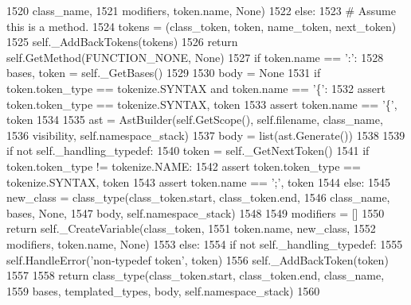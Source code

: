 \begin{DoxyCode}
1520                                                 class\_name,
1521                                                 modifiers, token.name, \textcolor{keywordtype}{None})
1522                 \textcolor{keywordflow}{else}:
1523                     \textcolor{comment}{# Assume this is a method.}
1524                     tokens = (class\_token, token, name\_token, next\_token)
1525                     self.\_AddBackTokens(tokens)
1526                     \textcolor{keywordflow}{return} self.GetMethod(FUNCTION\_NONE, \textcolor{keywordtype}{None})
1527             \textcolor{keywordflow}{if} token.name == \textcolor{stringliteral}{':'}:
1528                 bases, token = self.\_GetBases()
1529 
1530         body = \textcolor{keywordtype}{None}
1531         \textcolor{keywordflow}{if} token.token\_type == tokenize.SYNTAX \textcolor{keywordflow}{and} token.name == \textcolor{stringliteral}{'\{'}:
1532             \textcolor{keyword}{assert} token.token\_type == tokenize.SYNTAX, token
1533             \textcolor{keyword}{assert} token.name == \textcolor{stringliteral}{'\{'}, token
1534 
1535             ast = AstBuilder(self.GetScope(), self.filename, class\_name,
1536                              visibility, self.namespace\_stack)
1537             body = list(ast.Generate())
1538 
1539             \textcolor{keywordflow}{if} \textcolor{keywordflow}{not} self.\_handling\_typedef:
1540                 token = self.\_GetNextToken()
1541                 \textcolor{keywordflow}{if} token.token\_type != tokenize.NAME:
1542                     \textcolor{keyword}{assert} token.token\_type == tokenize.SYNTAX, token
1543                     \textcolor{keyword}{assert} token.name == \textcolor{stringliteral}{';'}, token
1544                 \textcolor{keywordflow}{else}:
1545                     new\_class = class\_type(class\_token.start, class\_token.end,
1546                                            class\_name, bases, \textcolor{keywordtype}{None},
1547                                            body, self.namespace\_stack)
1548 
1549                     modifiers = []
1550                     \textcolor{keywordflow}{return} self.\_CreateVariable(class\_token,
1551                                                 token.name, new\_class,
1552                                                 modifiers, token.name, \textcolor{keywordtype}{None})
1553         \textcolor{keywordflow}{else}:
1554             \textcolor{keywordflow}{if} \textcolor{keywordflow}{not} self.\_handling\_typedef:
1555                 self.HandleError(\textcolor{stringliteral}{'non-typedef token'}, token)
1556             self.\_AddBackToken(token)
1557 
1558         \textcolor{keywordflow}{return} class\_type(class\_token.start, class\_token.end, class\_name,
1559                           bases, templated\_types, body, self.namespace\_stack)
1560 
\end{DoxyCode}
